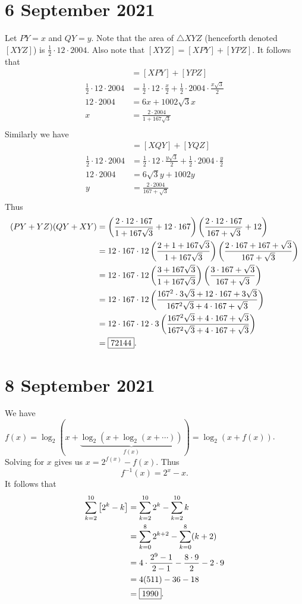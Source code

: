 \documentclass[letterpaper,oneside]{scrartcl}
\begin{document}
\section*{6 September 2021}
Let \(PY=x\)  and \(QY=y.\) 
Note that the area of \(\triangle XYZ\) (henceforth denoted \([XYZ]\)) is \(\frac{1}{2}\cdot12\cdot2004.\)
Also note that \([XYZ]=[XPY]+[YPZ].\) It follows that
\begin{align*}
    [XYZ]&=[XPY]+[YPZ]\\
    \frac12\cdot12\cdot2004 &= \frac12\cdot12\cdot\frac{x}{2}+\frac12\cdot2004\cdot\frac{x\sqrt3}{2}\\
    12\cdot2004&=6x+1002\sqrt3x\\
    x&= \frac{2\cdot2004}{1+167\sqrt3}\\
\end{align*}
Similarly we have
\begin{align*}
    [XYZ]&=[XQY]+[YQZ]\\
    \frac12\cdot12\cdot2004 &= \frac12\cdot12\cdot\frac{y\sqrt3}{2}+\frac12\cdot2004\cdot\frac{y}{2}\\
    12\cdot2004&=6\sqrt3y+1002y\\
    y&=\frac{2\cdot2004}{167+\sqrt3}\\
\end{align*}
Thus
\begin{align*}
    (PY+YZ)(QY+XY)&=\left(\frac{2\cdot12\cdot167}{1+167\sqrt3}+12\cdot167\right)\left(\frac{2\cdot12\cdot167}{167+\sqrt3}+12\right)\\
    &=12\cdot167\cdot12\left(\frac{2+1+167\sqrt3}{1+167\sqrt3}\right)\left(\frac{2\cdot167+167+\sqrt3}{167+\sqrt3}\right)\\
    &=12\cdot167\cdot12\left(\frac{3+167\sqrt3}{1+167\sqrt3}\right)\left(\frac{3\cdot167+\sqrt3}{167+\sqrt3}\right)\\
    &=12\cdot167\cdot12\left(\frac{167^2\cdot3\sqrt3+12\cdot167+3\sqrt3}{167^2\sqrt3+4\cdot167+\sqrt3}\right)\\
    &=12\cdot167\cdot12\cdot3\left(\frac{167^2\sqrt3+4\cdot167+\sqrt3}{167^2\sqrt3+4\cdot167+\sqrt3}\right)\\
    &=\fbox{72144}.
\end{align*}
\section*{8 September 2021}
We have \(f(x)=\log_2(x+\underbrace{\log_2(x+\log_2(x+\cdots))}_{f(x)}) = \log_2(x+f(x))\). Solving for \(x\) gives us \(x=2^{f(x)}-f(x).\) Thus 
\[f^{-1}(x)=2^x-x.\]
It follows that
\begin{align*}
    \sum_{k=2}^{10} \left[2^k-k\right] &= \sum_{k=2}^{10}2^k-\sum_{k=2}^{10}k\\
    &= \sum_{k=0}^{8} 2^{k+2}-\sum_{k=0}^{8}(k+2)\\
    &= 4\cdot\frac{2^9-1}{2-1}-\frac{8\cdot9}{2}-2\cdot9\\
    &= 4(511)-36-18\\
    &= \fbox{1990}.
\end{align*}
\end{document}
